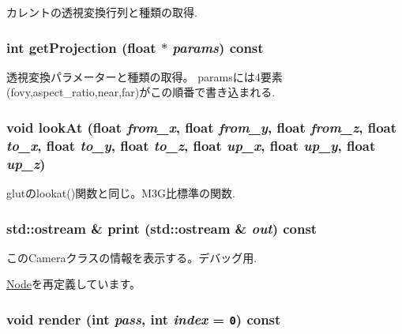 カレントの透視変換行列と種類の取得. \hypertarget{classm3g_1_1Camera_a2ebe46a4e16fee86d4f547588411302}{
\subsubsection[{getProjection}]{\setlength{\rightskip}{0pt plus 5cm}int getProjection (float $\ast$ {\em params}) const}}
\label{classm3g_1_1Camera_a2ebe46a4e16fee86d4f547588411302}


透視変換パラメーターと種類の取得。 paramsには4要素(fovy,aspect\_\-ratio,near,far)がこの順番で書き込まれる. \hypertarget{classm3g_1_1Camera_0006b18ae0e27a031d533e987b9756a8}{
\subsubsection[{lookAt}]{\setlength{\rightskip}{0pt plus 5cm}void lookAt (float {\em from\_\-x}, \/  float {\em from\_\-y}, \/  float {\em from\_\-z}, \/  float {\em to\_\-x}, \/  float {\em to\_\-y}, \/  float {\em to\_\-z}, \/  float {\em up\_\-x}, \/  float {\em up\_\-y}, \/  float {\em up\_\-z})}}
\label{classm3g_1_1Camera_0006b18ae0e27a031d533e987b9756a8}


glutのlookat()関数と同じ。M3G比標準の関数. \hypertarget{classm3g_1_1Camera_6fea17fa1532df3794f8cb39cb4f911f}{
\subsubsection[{print}]{\setlength{\rightskip}{0pt plus 5cm}std::ostream \& print (std::ostream \& {\em out}) const}}
\label{classm3g_1_1Camera_6fea17fa1532df3794f8cb39cb4f911f}


このCameraクラスの情報を表示する。デバッグ用. 

\hyperlink{classm3g_1_1Node_6fea17fa1532df3794f8cb39cb4f911f}{Node}を再定義しています。\hypertarget{classm3g_1_1Camera_1efcb1973989d9963d5bd6d03065d389}{
\subsubsection[{render}]{\setlength{\rightskip}{0pt plus 5cm}void render (int {\em pass}, \/  int {\em index} = {\tt 0}) const}}
\label{classm3g_1_1Camera_1efcb1973989d9963d5bd6d03065d389}


